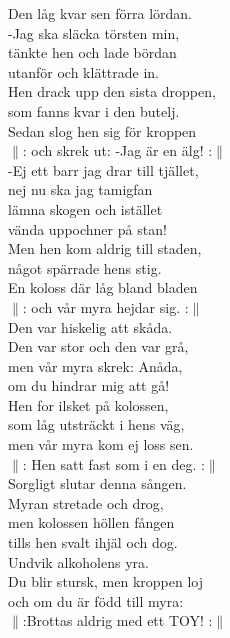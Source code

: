 \documentclass[a6paper, 10pt, twoside]{article}
\begin{document}
\begin{lyrics}
\newpage
Den låg kvar sen förra lördan.\\ 
-Jag ska släcka törsten min,\\ 
tänkte hen och lade bördan\\ 
utanför och klättrade in.\\ 
Hen drack upp den sista droppen,\\ 
som fanns kvar i den butelj.\\ 
Sedan slog hen sig för kroppen\\
$\|$: och skrek ut: -Jag är en älg! :$\|$
\vspace{5pt}\\  
-Ej ett barr jag drar till tjället,\\ 
nej nu ska jag tamigfan\\ 
lämna skogen och istället\\ 
vända uppochner på stan!\\ 
Men hen kom aldrig till staden,\\ 
något spärrade hens stig.\\ 
En koloss där låg bland bladen\\ 
$\|$: och vår myra hejdar sig. :$\|$
\vspace{5pt}\\  
Den var hiskelig att skåda.\\ 
Den var stor och den var grå,\\ 
men vår myra skrek: Anåda,\\ 
om du hindrar mig att gå!\\ 
Hen for ilsket på kolossen,\\ 
som låg utsträckt i hens väg,\\ 
men vår myra kom ej loss sen.\\ 
$\|$: Hen satt fast som i en deg. :$\|$
\vspace{5pt}\\  
Sorgligt slutar denna sången.\\ 
Myran stretade och drog,\\ 
men kolossen höllen fången\\ 
tills hen svalt ihjäl och dog.\\ 
Undvik alkoholens yra.\\ 
Du blir stursk, men kroppen loj\\ 
och om du är född till myra:\\ 
$\|$:Brottas aldrig med ett TOY! :$\|$ 
\end{lyrics}
\end{document}
